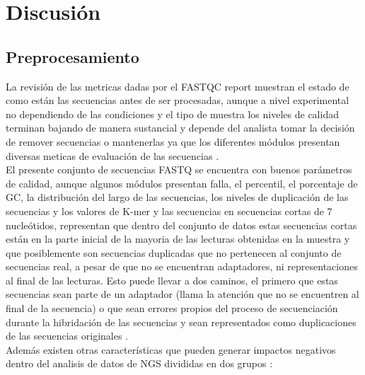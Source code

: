 \section{Discusión}

\subsection*{Preprocesamiento}

La revisión de las metricas dadas por el FASTQC report muestran el estado de como están las secuencias antes de ser procesadas, aunque a nivel experimental no dependiendo de las condiciones y el tipo de muestra los niveles de calidad terminan bajando de manera sustancial y depende del analista tomar la decisión de remover secuencias o mantenerlas ya que los diferentes módulos presentan diversas meticas de evaluación de las secuencias \cite{Babraham2016}. \\

El presente conjunto de secuencias FASTQ se encuentra con buenos parámetros de calidad, aunque algunos módulos presentan falla, el percentil, el porcentaje de GC, la distribución del largo de las secuencias, los niveles de duplicación de las secuencias y los valores de K-mer y las secuencias en secuencias cortas de 7 nucleótidos, representan que dentro del conjunto de datos estas secuencias cortas están en la parte inicial de la mayoria de las lecturas obtenidas en la muestra y que posiblemente son secuencias duplicadas que no pertenecen al conjunto de secuencias real, a pesar de que no se encuentran adaptadores, ni representaciones al final de las lecturas. Esto puede llevar a dos caminos, el primero que estas secuencias sean parte de un adaptador (llama la atención que no se encuentren al final de la secuencia)  o que sean errores propios del proceso de secuenciación durante la hibridación de las secuencias y sean representados como duplicaciones de las secuencias originales \cite{Babraham2016}\cite{Pirooznia2014}. \\ 

Además existen otras características que pueden generar impactos negativos dentro del analisis de datos de NGS divididas en dos grupos \cite{Zhou2013}: 

